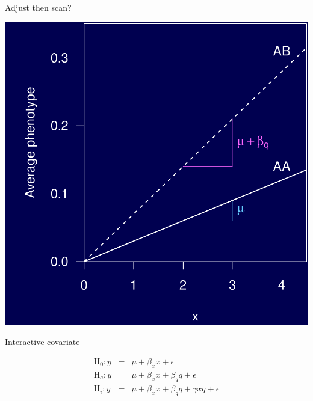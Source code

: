 \documentclass[12pt]{article}
\newcommand{\headsize}{\fontsize{35}{35} \selectfont}
\newcommand{\smallsize}{\fontsize{25}{30} \selectfont}
\begin{document}
\newpage

\headsize \color{myyellow}
\hfill \begin{minipage}{5.75in}
\centering
Adjust then scan?
\end{minipage}

\vfill

\centerline{\includegraphics{FigsA/y_over_x.pdf}}




\newpage

\headsize \color{myyellow}
\hfill \begin{minipage}{5.75in}
\centering
Interactive covariate
\end{minipage}

\vspace{15mm}

\color{mywhite} \smallsize

\begin{eqnarray*}
\text{H}_0: y & = & \mu + \beta_x x + \epsilon \\
\text{H}_a: y & = & \mu + \beta_x x + \beta_q q + \epsilon \\
\text{H}_i: y & = & \mu + \beta_x x + \beta_q q + \gamma x q + \epsilon
\end{eqnarray*}

\vspace{15mm}
\end{document}
